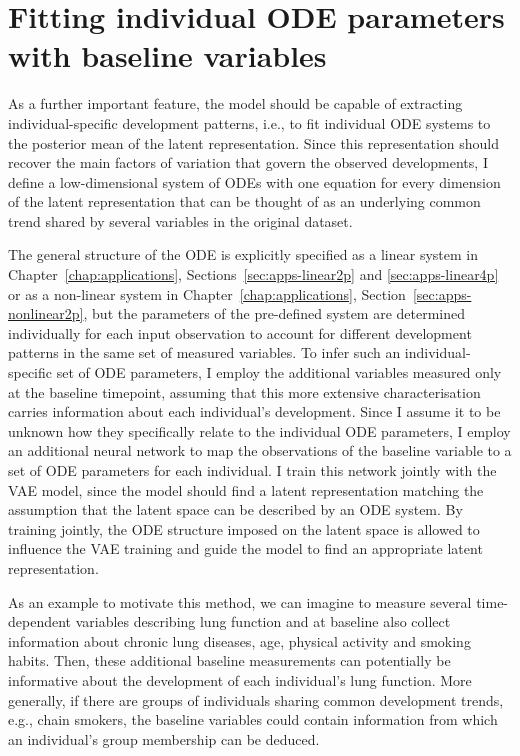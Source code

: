 \section{Fitting individual ODE parameters with baseline variables}\label{sec:methods-ODEparamswithbaselineinfo}

As a further important feature, the model should be capable of extracting individual-specific development patterns, i.e., to fit individual ODE systems to the posterior mean of the latent representation. Since this representation should recover the main factors of variation that govern the observed developments, I define a low-dimensional system of ODEs with one equation for every dimension of the latent representation that can be thought of as an underlying common trend shared by several variables in the original dataset.  

The general structure of the ODE is explicitly specified as a linear system in Chapter~\ref{chap:applications}, Sections~\ref{sec:apps-linear2p} and \ref{sec:apps-linear4p} or as a non-linear system in Chapter~\ref{chap:applications}, Section~\ref{sec:apps-nonlinear2p}, but the parameters of the pre-defined system are determined individually for each input observation to account for different development patterns in the same set of measured variables.
To infer such an individual-specific set of ODE parameters, I employ the additional variables measured only at the baseline timepoint, assuming that this more extensive characterisation carries information about each individual's development. 
Since I assume it to be unknown how they specifically relate to the individual ODE parameters, I employ an additional neural network to map the observations of the baseline variable to a set of ODE parameters for each individual. I train this network jointly with the VAE model, since the model should find a latent representation matching the assumption that the latent space can be described by an ODE system. By training jointly, the ODE structure imposed on the latent space is allowed to influence the VAE training and guide the model to find an appropriate latent representation.

As an example to motivate this method, we can imagine to measure several time-dependent variables describing lung function and at baseline also collect information about chronic lung diseases, age, physical activity and smoking habits. Then, these additional baseline measurements can potentially be informative about the development of each individual's lung function. More generally, if there are groups of individuals sharing common development trends, e.g., chain smokers, the baseline variables could contain information from which an individual's group membership can be deduced. 

